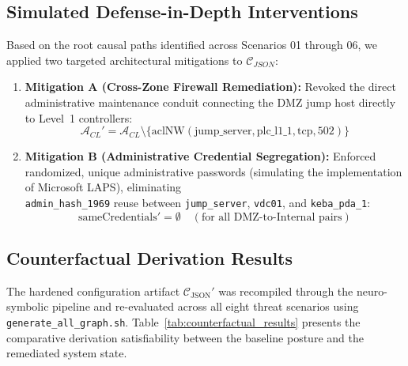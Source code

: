 \documentclass[target=mst,aauheader=aics,style=]{thud}
\begin{document}
\subsection{Simulated Defense-in-Depth Interventions}
Based on the root causal paths identified across Scenarios 01 through 06, we applied two targeted architectural mitigations to $\mathcal{C}_{JSON}$:
\begin{enumerate}
    \item \textbf{Mitigation A (Cross-Zone Firewall Remediation):} Revoked the direct administrative maintenance conduit connecting the DMZ jump host directly to Level~1 controllers:
    \begin{equation}
        \mathcal{A}_{CL}' = \mathcal{A}_{CL} \setminus \{\text{aclNW}(\text{jump\_server}, \text{plc\_l1\_1}, \text{tcp}, 502)\}
    \end{equation}
    \item \textbf{Mitigation B (Administrative Credential Segregation):} Enforced randomized, unique administrative passwords (simulating the implementation of Microsoft LAPS), eliminating \\\texttt{admin\_hash\_1969} reuse between \texttt{jump\_server}, \texttt{vdc01}, and \texttt{keba\_pda\_1}:
    \begin{equation}
        \text{sameCredentials}' = \emptyset \quad (\text{for all DMZ-to-Internal pairs})
    \end{equation}
\end{enumerate}

\subsection{Counterfactual Derivation Results}
The hardened configuration artifact $\mathcal{C}_{\text{JSON}}'$ was recompiled through the neuro-symbolic pipeline and re-evaluated across all eight threat scenarios using \texttt{generate\_all\_graph.sh}. Table~\ref{tab:counterfactual_results} presents the comparative derivation satisfiability between the baseline posture and the remediated system state.
\end{document}
